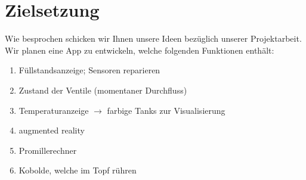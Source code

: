 \clearpage
\section{Zielsetzung}
Wie besprochen schicken wir Ihnen unsere Ideen bezüglich unserer Projektarbeit. 
Wir planen eine App zu entwickeln, welche folgenden Funktionen enthält:

\begin{enumerate}
    \item Füllstandsanzeige; Sensoren reparieren
    \item Zustand der Ventile (momentaner Durchfluss)
    \item Temperaturanzeige $\rightarrow$ farbige Tanks zur Visualisierung 
    \item augmented reality
    \item Promillerechner
    \item Kobolde, welche im Topf rühren
\end{enumerate}
